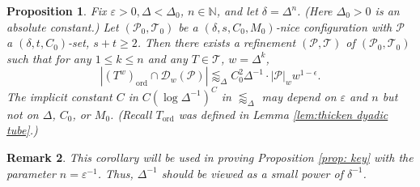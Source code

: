 \documentclass{amsart}
\newtheorem{prop}{Proposition}[section]
\newtheorem{remark}[prop]{Remark}
\newcommand{\N}{\mathbb{N}}
\newcommand{\eps}{\varepsilon}
\newcommand{\cD}{\mathcal{D}}
\newcommand{\cT}{\mathcal{T}}
\newcommand{\cP}{\mathcal{P}}
\newcommand{\ord}{\mathrm{ord}}
\begin{document}
\begin{prop}\label{prop:s+t=2}
    Fix $\eps > 0, \Delta < \Delta_0$, $n \in \N$, and let $\delta = \Delta^n$. (Here $\Delta_0 > 0$ is an absolute constant.) Let $(\cP_0, \cT_0)$ be a $(\delta, s, C_0, M_0)$-nice configuration with $\cP$ a $(\delta, t, C_0)$-set, $s+t\geq 2$. Then there exists a refinement $(\cP, \cT)$ of $(\cP_0, \cT_0)$ such that for any $1 \le k \le n$ and any $T\in \cT$, $w = \Delta^k$,
    \begin{equation}\label{eqn:cor s+t=2}
        |(T^w)_\ord \cap \cD_w (\cP)| \lessapprox_{\Delta} C_0^2 \Delta^{-1} \cdot |\cP|_w w^{1-\epsilon}.
    \end{equation}
    The implicit constant $C$ in $C (\log \Delta^{-1})^C$ in $\lessapprox_{\Delta}$ may depend on $\eps$ and $n$ but not on $\Delta$, $C_0$, or $M_0$. (Recall $T_\ord$ was defined in Lemma \ref{lem:thicken dyadic tube}.)
\end{prop}

\begin{remark}
    This corollary will be used in proving Proposition \ref{prop: key} with the parameter $n = \eps^{-1}$. Thus, $\Delta^{-1}$ should be viewed as a small power of $\delta^{-1}$.
\end{remark}
\end{document}
